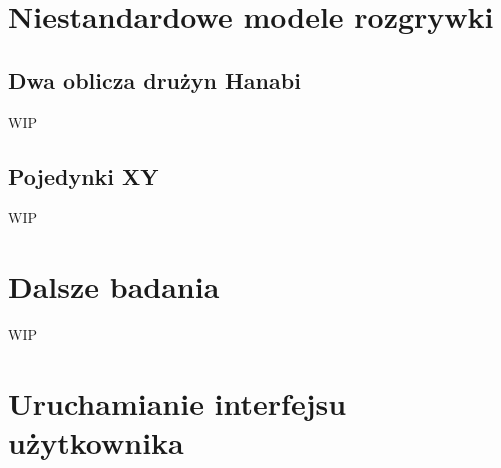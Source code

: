 \documentclass[declaration,shortabstract,inz]{iithesis}
\begin{document}

\chapter{Niestandardowe modele rozgrywki}

\section{Dwa oblicza drużyn Hanabi}

WIP

\section{Pojedynki XY}

WIP

\chapter{Dalsze badania}

WIP

\appendix
\chapter{Uruchamianie interfejsu użytkownika}
\end{document}

